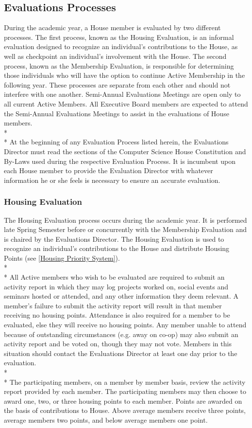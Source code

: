 \documentclass{article}
\newcommand{\bsection}[1]{\subsection{#1} \label{#1}}
\newcommand{\bsubsection}[1]{\subsubsection{#1} \label{#1}}
\begin{document}
\bsection{Evaluations Processes}
During the academic year, a House member is evaluated by two different processes. The first process, known as the Housing Evaluation, is an informal evaluation designed to recognize an individual's contributions to the House, as well as checkpoint an individual's involvement with the House. The second process, known as the Membership Evaluation, is responsible for determining those individuals who will have the option to continue Active Membership in the following year. These processes are separate from each other and should not interfere with one another. Semi-Annual Evaluations Meetings are open only to all current Active Members. All Executive Board members are expected to attend the Semi-Annual Evaluations Meetings to assist in the evaluations of House members.
\\* \\*
At the beginning of any Evaluation Process listed herein, the Evaluations Director must read the sections of the Computer Science House Constitution and By-Laws used during the respective Evaluation Process. It is incumbent upon each House member to provide the Evaluation Director with whatever information he or she feels is necessary to ensure an accurate evaluation.
\bsubsection{Housing Evaluation}
The Housing Evaluation process occurs during the academic year. It is performed late Spring Semester before or concurrently with the Membership Evaluation and is chaired by the Evaluations Director. The Housing Evaluation is used to recognize an individual’s contributions to the House and distribute Housing Points (see \ref{Housing Priority System}).
\\* \\*
All Active members who wish to be evaluated are required to submit an activity report in which they may log projects worked on, social events and seminars hosted or attended, and any other information they deem relevant. A member’s failure to submit the activity report will result in that member receiving no housing points. Attendance is also required for a member to be evaluated, else they will receive no housing points. Any member unable to attend because of outstanding circumstances (e.g. away on co-op) may also submit an activity report and be voted on, though they may not vote. Members in this situation should contact the Evaluations Director at least one day prior to the evaluation.
\\* \\*
The participating members, on a member by member basis, review the activity report provided by each member. The participating members may then choose to award one, two, or three housing points to each member. Points are awarded on the basis of contributions to House. Above average members receive three points, average members two points, and below average members one point.
\end{document}
